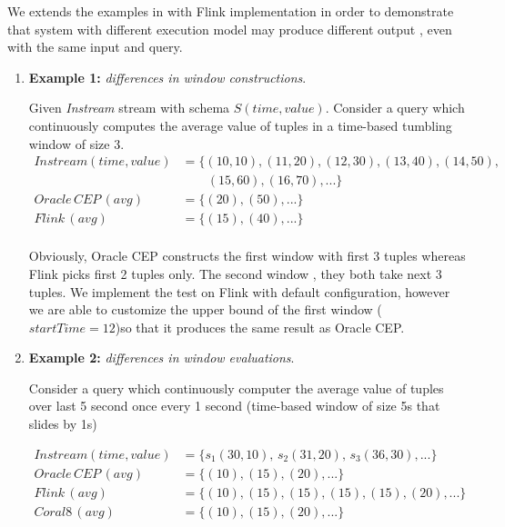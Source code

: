 We extends the examples in \citep{Dindar:2013} with Flink implementation in order to demonstrate that system with different execution model may produce different output , even with the same input and query. 
\begin{enumerate}

\item \textbf{Example 1:} \textit{differences in window constructions}.

Given \textit{Instream} stream with schema $S(time, value)$. Consider a query which continuously computes the average value of tuples in a time-based tumbling window of size 3.
\begin{align*}
Instream(time,value) &= \{(10,10),(11,20),(12,30),(13,40),(14,50),\\
&\qquad (15,60),(16,70),...\} \\
Oracle\, CEP\, (avg)		&= \{(20), (50),...\} \\
Flink\, (avg)			&= \{(15), (40),...\} \\
\end{align*}

Obviously, Oracle CEP constructs the first window with first 3 tuples whereas Flink picks first 2 tuples only. The second window , they both take next 3 tuples. We implement the test on Flink with default configuration, however we are able to customize the upper bound of the first window ($startTime = 12$)so that it produces the same result as Oracle CEP.


\item \textbf{Example 2:} \textit{differences in window evaluations}.

Consider a query which continuously computer the average value of tuples over last 5 second once every 1 second (time-based window of size 5s that slides by 1s)

\begin{align*}
Instream(time,value) 	&= \{s_1(30,10),\,s_2(31,20),\,s_3(36,30),...\} \\
Oracle\, CEP\, (avg)		&= \{(10), (15),(20),...\} \\
Flink\, (avg)			&= \{(10), (15), (15), (15), (15), (20),...\}\\
Coral8\, (avg)			&= \{(10), (15),(20),...\}			
\end{align*}


\end{enumerate}
